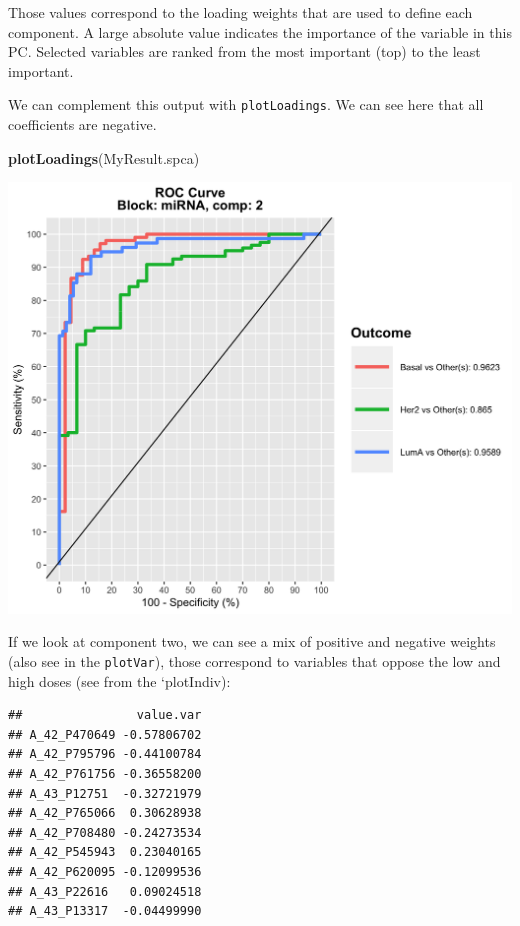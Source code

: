 \documentclass[]{book}
\newenvironment{Shaded}{\begin{snugshade}}{\end{snugshade}}
\newcommand{\KeywordTok}[1]{\textcolor[rgb]{0.13,0.29,0.53}{\textbf{#1}}}
\newcommand{\DataTypeTok}[1]{\textcolor[rgb]{0.13,0.29,0.53}{#1}}
\newcommand{\DecValTok}[1]{\textcolor[rgb]{0.00,0.00,0.81}{#1}}
\newcommand{\OperatorTok}[1]{\textcolor[rgb]{0.81,0.36,0.00}{\textbf{#1}}}
\newcommand{\NormalTok}[1]{#1}
\theoremstyle{definition}
\theoremstyle{definition}
\theoremstyle{definition}
\theoremstyle{remark}
\begin{document}
Those values correspond to the loading weights that are used to define
each component. A large absolute value indicates the importance of the
variable in this PC. Selected variables are ranked from the most
important (top) to the least important.

We can complement this output with \texttt{plotLoadings}. We can see
here that all coefficients are negative.

\begin{Shaded}
\begin{Highlighting}[]
\KeywordTok{plotLoadings}\NormalTok{(MyResult.spca)}
\end{Highlighting}
\end{Shaded}

\begin{center}\includegraphics[width=0.5\linewidth]{Figures/unnamed-chunk-12-1} \end{center}

If we look at component two, we can see a mix of positive and negative
weights (also see in the \texttt{plotVar}), those correspond to
variables that oppose the low and high doses (see from the `plotIndiv):

\begin{Shaded}
\end{Shaded}

\begin{verbatim}
##                value.var
## A_42_P470649 -0.57806702
## A_42_P795796 -0.44100784
## A_42_P761756 -0.36558200
## A_43_P12751  -0.32721979
## A_42_P765066  0.30628938
## A_42_P708480 -0.24273534
## A_42_P545943  0.23040165
## A_42_P620095 -0.12099536
## A_43_P22616   0.09024518
## A_43_P13317  -0.04499990
\end{verbatim}
\end{document}
